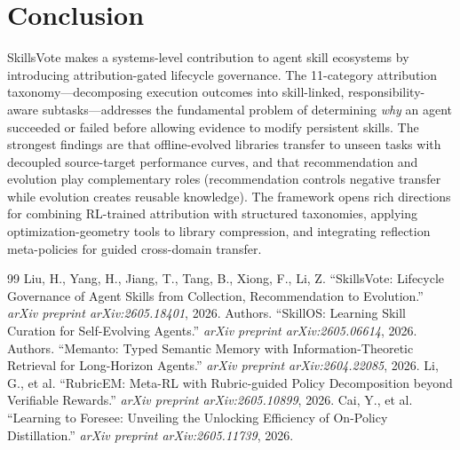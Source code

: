 \documentclass[11pt,a4paper]{article}
\begin{document}
\section{Conclusion}

SkillsVote makes a systems-level contribution to agent skill ecosystems by introducing attribution-gated lifecycle governance. The 11-category attribution taxonomy---decomposing execution outcomes into skill-linked, responsibility-aware subtasks---addresses the fundamental problem of determining \textit{why} an agent succeeded or failed before allowing evidence to modify persistent skills. The strongest findings are that offline-evolved libraries transfer to unseen tasks with decoupled source-target performance curves, and that recommendation and evolution play complementary roles (recommendation controls negative transfer while evolution creates reusable knowledge). The framework opens rich directions for combining RL-trained attribution with structured taxonomies, applying optimization-geometry tools to library compression, and integrating reflection meta-policies for guided cross-domain transfer.

\begin{thebibliography}{99}
 Liu, H., Yang, H., Jiang, T., Tang, B., Xiong, F., Li, Z. ``SkillsVote: Lifecycle Governance of Agent Skills from Collection, Recommendation to Evolution.'' \textit{arXiv preprint arXiv:2605.18401}, 2026.
 Authors. ``SkillOS: Learning Skill Curation for Self-Evolving Agents.'' \textit{arXiv preprint arXiv:2605.06614}, 2026.
 Authors. ``Memanto: Typed Semantic Memory with Information-Theoretic Retrieval for Long-Horizon Agents.'' \textit{arXiv preprint arXiv:2604.22085}, 2026.
 Li, G., et al. ``RubricEM: Meta-RL with Rubric-guided Policy Decomposition beyond Verifiable Rewards.'' \textit{arXiv preprint arXiv:2605.10899}, 2026.
 Cai, Y., et al. ``Learning to Foresee: Unveiling the Unlocking Efficiency of On-Policy Distillation.'' \textit{arXiv preprint arXiv:2605.11739}, 2026.
\end{thebibliography}
\end{document}
